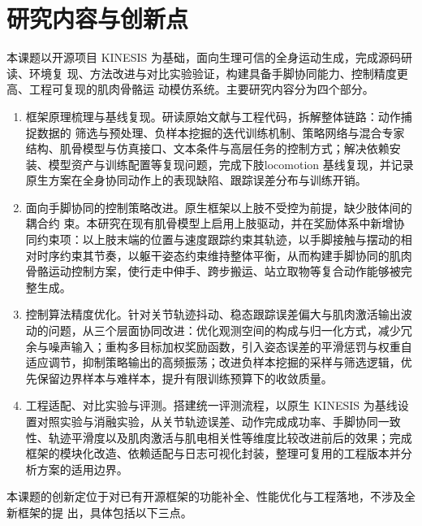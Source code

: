 \section{研究内容与创新点}
本课题以开源项目 KINESIS 为基础，面向生理可信的全身运动生成，完成源码研读、环境复
现、方法改进与对比实验验证，构建具备手脚协同能力、控制精度更高、工程可复现的肌肉骨骼运
动模仿系统。主要研究内容分为四个部分。
\begin{enumerate}
	\item 框架原理梳理与基线复现。研读原始文献与工程代码，拆解整体链路：动作捕捉数据的	筛选与预处理、负样本挖掘的迭代训练机制、策略网络与混合专家结构、肌骨模型与仿真接口、文本条件与高层任务的控制方式；解决依赖安装、模型资产与训练配置等复现问题，完成下肢locomotion 基线复现，并记录原生方案在全身协同动作上的表现缺陷、跟踪误差分布与训练开销。
	\item 面向手脚协同的控制策略改进。原生框架以上肢不受控为前提，缺少肢体间的耦合约
	束。本研究在现有肌骨模型上启用上肢驱动，并在奖励体系中新增协同约束项：以上肢末端的位置与速度跟踪约束其轨迹，以手脚接触与摆动的相对时序约束其节奏，以躯干姿态约束维持整体平衡，从而构建手脚协同的肌肉骨骼运动控制方案，使行走中伸手、跨步搬运、站立取物等复合动作能够被完整生成。
	\item 控制算法精度优化。针对关节轨迹抖动、稳态跟踪误差偏大与肌肉激活输出波动的问题，从三个层面协同改进：优化观测空间的构成与归一化方式，减少冗余与噪声输入；重构多目标加权奖励函数，引入姿态误差的平滑惩罚与权重自适应调节，抑制策略输出的高频振荡；改进负样本挖掘的采样与筛选逻辑，优先保留边界样本与难样本，提升有限训练预算下的收敛质量。
	\item 工程适配、对比实验与评测。搭建统一评测流程，以原生 KINESIS 为基线设置对照实验与消融实验，从关节轨迹误差、动作完成成功率、手脚协同一致性、轨迹平滑度以及肌肉激活与肌电相关性等维度比较改进前后的效果；完成框架的模块化改造、依赖适配与日志可视化封装，整理可复用的工程版本并分析方案的适用边界。
\end{enumerate}
本课题的创新定位于对已有开源框架的功能补全、性能优化与工程落地，不涉及全新框架的提
出，具体包括以下三点。
